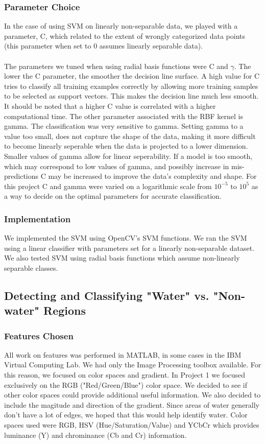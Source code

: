 \documentclass[12pt]{article}
\begin{document}
	\subsubsection{Parameter Choice} In the case of using SVM on linearly non-separable data, we played with a parameter, C, which related to the extent of wrongly categorized data points (this parameter when set to 0 assumes linearly separable data).\\
\\
	The parameters we tuned when using radial basis functions were C and $\gamma$. 
The lower the C parameter, the smoother the decision line surface. A high value for C tries to classify all training examples
correctly by allowing more training samples to be selected as support vectors. This makes the decision line much less smooth. It should
be noted that a higher C value is correlated with a higher computational time. 
The other parameter associated with the RBF kernel is gamma. The classification was very sensitive to gamma. Setting gamma to a value too small, does 
not capture the shape of the data, making it more difficult to become linearly seperable when the data is projected to a lower dimension. 
Smaller values of gamma allow for linear seperability. If a model is too smooth, which may correspond to low values of gamma, and possibly increase in 
mis-predictions C may be increased to improve the data's complexity and shape. 
For this project C and gamma were varied on a logarithmic scale from $10^{-5}$ to $10^5$ as a way to decide on the optimal parameters for accurate classification.

	\subsubsection{Implementation}
	We implemented the SVM using OpenCV's SVM functions. We ran the SVM using a linear classifier with parameters set for a linearly non-separable dataset. We also tested SVM using radial basis functions which assume non-linearly separable classes. 
	\subsection{Detecting and Classifying "Water" vs. "Non-water" Regions}
	\subsubsection{Features Chosen}
	All work on features was performed in MATLAB, in some cases in the IBM Virtual Computing Lab. We had only the Image Processing toolbox available. For this reason, we focused on color spaces and gradient. In Project 1 we focused exclusively on the RGB ("Red/Green/Blue") color space. We decided to see if other color spaces could provide additional useful information. We also decided to include the magitude and direction of the gradient. Since areas of water generally don't have a lot of edges, we hoped that this would help identify water. Color spaces used were RGB, HSV (Hue/Saturation/Value) and YCbCr which provides luminance (Y) and chrominance (Cb and Cr) information.\\
\end{document}
